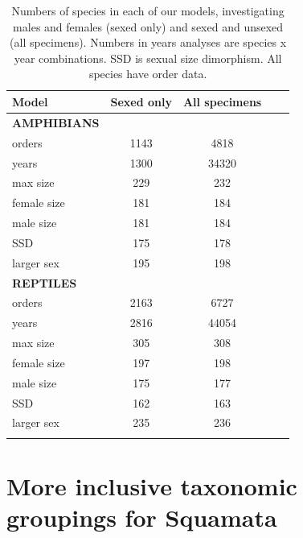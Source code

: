 \documentclass[a4paper, 12pt]{article}
\begin{document}
\begin{table}[H]
\centering
\begin{tabular}{lcccc}

  \hline
  \textbf{Model} & \textbf{Sexed only} & \textbf{All specimens}\\ 
  \hline
  \textbf{AMPHIBIANS} & &\\
  \hline
  orders & 1143 & 4818\\
  years & 1300 & 34320\\
  max size & 229 & 232\\
  female size & 181 & 184\\
  male size & 181 & 184\\
  SSD & 175 & 178\\
  larger sex & 195 & 198\\
  \hline
  \textbf{REPTILES} & &\\
  \hline
  orders & 2163 & 6727\\
  years & 2816 & 44054\\
  max size & 305 & 308\\
  female size & 197 & 198\\
  male size & 175 & 177\\
  SSD & 162 & 163\\
  larger sex & 235 & 236\\
  \hline

\label{table_numbers}
\end{tabular}
\caption{Numbers of species in each of our models, investigating males and females (sexed only) and sexed and unsexed (all specimens). Numbers in years analyses are species x year combinations. SSD is sexual size dimorphism. All species have order data.} 

\end{table}

\newpage
\section{More inclusive taxonomic groupings for Squamata}
%
\end{document}
